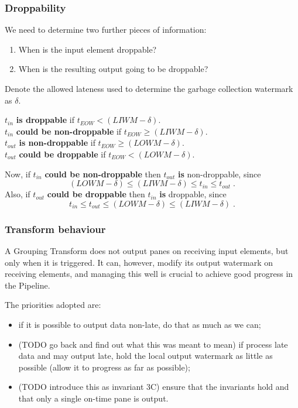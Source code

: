 \subsubsection{Droppability}

We need to determine two further pieces of information:
\begin{enumerate}
	\item When is the input element droppable?
	\item When is the resulting output going to be droppable?
\end{enumerate}

Denote the allowed lateness used to determine the garbage collection watermark as $\delta$.

$t_{\mathit{in}}$ \textbf{is droppable} if $t_{\mathit{EOW}} < (\mathit{LIWM} - \delta)$.\\
$t_{\mathit{in}}$ \textbf{could be non-droppable} if $t_{\mathit{EOW}} \geq (\mathit{LIWM} - \delta)$.\\
$t_{\mathit{out}}$ \textbf{is non-droppable} if $t_{\mathit{EOW}} \geq (\mathit{LOWM} - \delta)$.\\
$t_{\mathit{out}}$ \textbf{could be droppable} if $t_{\mathit{EOW}} < (\mathit{LOWM} - \delta)$.

Now, if $t_{\mathit{in}}$ \textbf{could be non-droppable} then $t_{\mathit{out}}$ \textbf{is} non-droppable, since \[(\mathit{LOWM} - \delta) \leq (\mathit{LIWM} - \delta) \leq t_{\mathit{in}} \leq t_{\mathit{out}}\;\text{.}\]
Also, if $t_{\mathit{out}}$ \textbf{could be droppable} then $t_{\mathit{in}}$ \textbf{is} droppable, since \[t_{\mathit{in}} \leq t_{\mathit{out}} \leq (\mathit{LOWM} - \delta) \leq (\mathit{LIWM} - \delta)\;\text{.}\]


\subsubsection{Transform behaviour}

A Grouping Transform does not output panes on receiving input elements, but only when it is triggered.
It can, however, modify its output watermark on receiving elements, and managing this well is crucial to achieve good progress in the Pipeline.

The priorities adopted are:
\begin{itemize}
	\item if it is possible to output data non-late, do that as much as we can;
	\item (TODO go back and find out what this was meant to mean) if process late data and may output late, hold the local output watermark as little as possible (allow it to progress as far as possible);
	\item (TODO introduce this as invariant 3C) ensure that the invariants hold and that only a single on-time pane is output.
\end{itemize}

